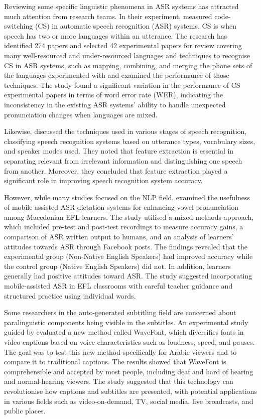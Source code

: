 \documentclass[english]{textolivre}
\begin{document}
Reviewing some specific linguistic phenomena in ASR systems has
attracted much attention from research teams. In their experiment,
\textcite{mustafa_code-switching_2022} measured
code-switching (CS) in automatic speech recognition (ASR) systems. CS is
when speech has two or more languages within an utterance. The research
has identified 274 papers and selected 42 experimental papers for review
covering many well-resourced and under-resourced languages and
techniques to recognise CS in ASR systems, such as mapping, combining,
and merging the phone sets of the languages experimented with and
examined the performance of those techniques. The study found a
significant variation in the performance of CS experimental papers in
terms of word error rate (WER), indicating the inconsistency in the
existing ASR systems' ability to handle unexpected pronunciation changes
when languages are mixed.

Likewise, \textcite{sawakare2015}
discussed the techniques used in various stages of speech recognition,
classifying speech recognition systems based on utterance types,
vocabulary sizes, and speaker modes used. They noted that feature
extraction is essential in separating relevant from irrelevant
information and distinguishing one speech from another. Moreover, they
concluded that feature extraction played a significant role in improving
speech recognition system accuracy.

However, while many studies focused on the NLP field,
\textcite{guskaroska_asr_2019} examined the usefulness of
mobile-assisted ASR dictation systems for enhancing vowel pronunciation
among Macedonian EFL learners. The study utilised a mixed-methods
approach, which included pre-test and post-test recordings to measure
accuracy gains, a comparison of ASR written output to humans, and an
analysis of learners' attitudes towards ASR through Facebook posts. The
findings revealed that the experimental group (Non-Native English
Speakers) had improved accuracy while the control group (Native English
Speakers) did not. In addition, learners generally had positive
attitudes toward ASR. The study suggested incorporating mobile-assisted
ASR in EFL classrooms with careful teacher guidance and structured
practice using individual words.

Some researchers in the auto-generated subtitling field are concerned
about paralinguistic components being visible in the subtitles. An
experimental study guided by \textcite{schlippe_visualizing_2020} evaluated a new method called WaveFont, which diversifies
fonts in video captions based on voice characteristics such as loudness,
speed, and pauses. The goal was to test this new method specifically for
Arabic viewers and to compare it to traditional captions. The results
showed that WaveFont is comprehensible and accepted by most people,
including deaf and hard of hearing and normal-hearing viewers. The study
suggested that this technology can revolutionise how captions and
subtitles are presented, with potential applications in various fields
such as video-on-demand, TV, social media, live broadcasts, and public
places.
\end{document}
